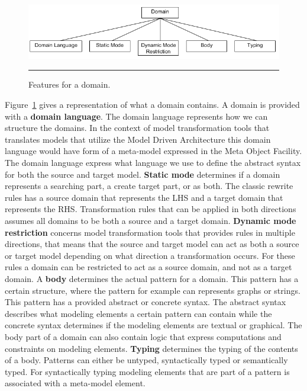 \begin{figure}[H]
  \centering
    \includegraphics[scale=0.7]{./Figures/Domain_2.png}
    \rule{35em}{0.5pt}
  \caption[Feature diagram a domain]
  {Features for a domain.}
  \label{fig:Domain}
\end{figure}

Figure~\ref{fig:Domain} gives a representation of what a domain contains. A
domain is provided with a \textbf{domain language}. The domain language
represents how we can structure the domains. In the context of model
transformation tools that translates models that utilize the Model Driven
Architecture this domain language would have form of a meta-model expressed in
the Meta Object Facility. The domain language express what language we use to
define the abstract syntax for both the source and target model. \textbf{Static
mode} determines if a domain represents a searching part, a create target part, 
or as both. The classic rewrite rules has a source domain that represents the
LHS and a target domain that represents the RHS. Transformation rules that can
be applied in both directions assumes all domains to be both a source and a
target domain. \textbf{Dynamic mode restriction} concerns model transformation
tools that provides rules in multiple directions, that means that the source
and target model can act as both a source or target model depending on what
direction a transformation occurs. For these rules a domain can be restricted to
act as a source domain, and not as a target domain. A \textbf{body} determines
the actual pattern for a domain. This pattern has a certain structure, where the
pattern for example can represents graphs or strings. This pattern has a
provided abstract or concrete syntax. The abstract syntax describes what
modeling elements a certain pattern can contain while the concrete syntax
determines if the modeling elements are textual or graphical. The body part of a
domain can also contain logic that express computations and constraints on
modeling elements. \textbf{Typing} determines the typing of the contents of a
body. Patterns can either be untyped, syntactically typed or semantically typed.
For syntactically typing modeling elements that are part of a pattern is
associated with a meta-model element.  

